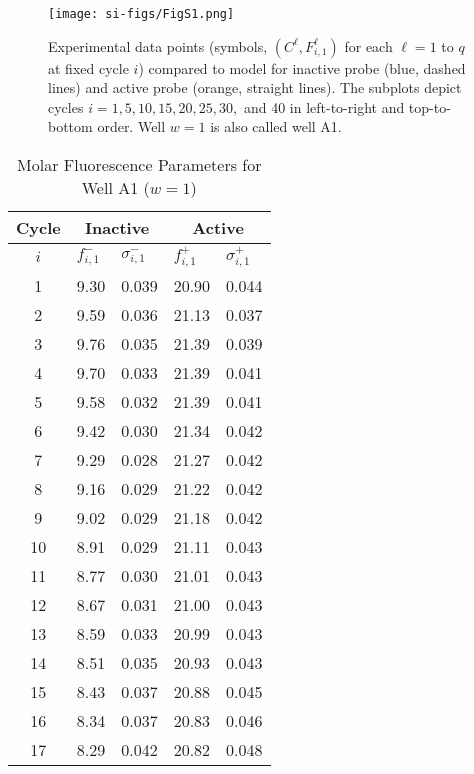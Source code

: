 
            \begin{figure}
                \centering
                \texttt{[image: si-figs/FigS1.png]}
                \caption{
                    Experimental data points (symbols, $(C^\ell, F_{i,1}^\ell)$ for each $\ell = 1$ to $q$
                    at fixed cycle $i$)
                    compared to model for inactive probe (blue, dashed lines)
                    and active probe (orange, straight lines).
                    The subplots depict cycles $i=1, 5, 10, 15, 20, 25, 30,$ and 40
                    in left-to-right and top-to-bottom order.
                    Well $w=1$ is also called well A1.
                }
                \label{fig:S1}
            \end{figure}
            \clearpage
            
    \begin{table}
        \caption{Molar Fluorescence Parameters for Well A1 ($w=1$)}
        \centering
        \begin{tabular}{c|ll|ll}
            Cycle & \multicolumn{2}{c|}{Inactive} & \multicolumn{2}{c}{Active} \\
            \hline
            $i$ & $f_{i,1}^{-}$ & $\sigma_{i,1}^{-}$ &  $f_{i,1}^{+}$ & $\sigma_{i,1}^{+}$ \\
            \hline
    1 & 9.30 & 0.039 & 20.90 & 0.044 \\
2 & 9.59 & 0.036 & 21.13 & 0.037 \\
3 & 9.76 & 0.035 & 21.39 & 0.039 \\
4 & 9.70 & 0.033 & 21.39 & 0.041 \\
5 & 9.58 & 0.032 & 21.39 & 0.041 \\
6 & 9.42 & 0.030 & 21.34 & 0.042 \\
7 & 9.29 & 0.028 & 21.27 & 0.042 \\
8 & 9.16 & 0.029 & 21.22 & 0.042 \\
9 & 9.02 & 0.029 & 21.18 & 0.042 \\
10 & 8.91 & 0.029 & 21.11 & 0.043 \\
11 & 8.77 & 0.030 & 21.01 & 0.043 \\
12 & 8.67 & 0.031 & 21.00 & 0.043 \\
13 & 8.59 & 0.033 & 20.99 & 0.043 \\
14 & 8.51 & 0.035 & 20.93 & 0.043 \\
15 & 8.43 & 0.037 & 20.88 & 0.045 \\
16 & 8.34 & 0.037 & 20.83 & 0.046 \\
17 & 8.29 & 0.042 & 20.82 & 0.048 \\

\end{tabular}
\end{table}
